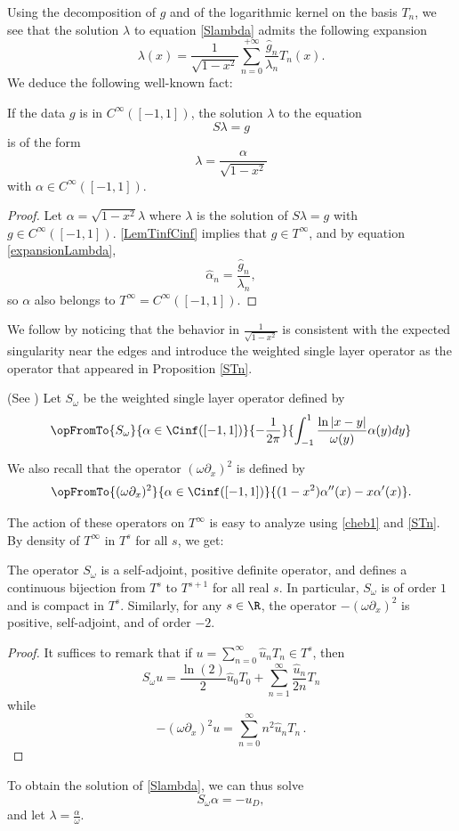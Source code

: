 \documentclass[a4paper]{article}
\begin{document}
	Using the decomposition of $g$ and of the logarithmic kernel on the basis $T_n$, we see that the solution $\lambda$ to equation \eqref{Slambda} admits the following expansion 
	\begin{equation}
	\lambda(x) = \frac{1}{\sqrt{1-x^2}}\sum_{n=0}^{+ \infty} \frac{\hat{g}_n}{\lambda_n} T_n(x).
	\label{expansionLambda}
	\end{equation}
	We deduce the following well-known fact:
	\begin{Cor}
		\label{CorSingularity}
		If the data $g$ is in $C^{\infty}([-1,1])$, the solution $\lambda$ to the equation 
		\[S\lambda = g\]
		is of the form 
		\[\lambda = \dfrac{\alpha}{\sqrt{1-x^2}}\]
		with $\alpha \in C^{\infty}([-1,1])$.  
		\begin{proof}
			Let $\alpha = \sqrt{1 - x^2}\lambda$ where $\lambda$ is the solution of $S\lambda = g$ with $g \in C^{\infty}([-1,1])$. 
			\autoref{LemTinfCinf} implies that $g \in T^{\infty}$, and by equation \eqref{expansionLambda}, 
			\[ \hat{\alpha}_n = \frac{\hat{g}_n}{\lambda_n},\]
			so $\alpha$ also  belongs to $T^{\infty} = C^{\infty}([-1,1])$. 
		\end{proof}
	\end{Cor}
	
	
	We follow \cite{bruno2012second} by noticing that the behavior in $\frac{1}{\sqrt{1-x^2}}$ is consistent with the expected singularity near the edges and introduce the weighted single layer operator as the operator that appeared in Proposition \ref{STn}.
	\begin{Def}(See \cite{bruno2012second}) 
		Let $S_\omega$ be the weighted single layer operator defined by
		\[\opFromTo{S_\omega}{\alpha \in \Cinf([-1,1])}{-\dfrac{1}{2\pi}}{\int_{-1}^1\dfrac{\ln|x-y|}{\omega(y)} \alpha(y)dy}\]
	\end{Def}
	\noindent We also recall that the operator $(\omega\partial_x)^2$ is defined by \[\opFromTo{(\omega\partial_x)^2}{\alpha \in \Cinf([-1,1])}{(1-x^2)\alpha''(x) - x \alpha'(x)}.\]
	
	The action of these operators on $T^{\infty}$ is easy to analyze using \eqref{cheb1} and \autoref{STn}. By density of $T^{\infty}$ in $T^s$ for all $s$, we get:
	\begin{Prop}
		The operator $S_\omega$ is a self-adjoint, positive definite operator, and defines a continuous bijection from $T^{s}$ to $T^{s+1}$ for all real $s$. In particular, $S_\omega$ is of order $1$ and is compact in $T^s$. 
		Similarly, for any $s \in \R$, the operator $-(\omega \partial_x)^2$ is positive, self-adjoint, and of order $-2$. 
	\end{Prop}
	\begin{proof}
		It suffices to remark that if $u=\sum_{n=0}^\infty \hat{u}_n T_n \in T^s$, then
		\[S_\omega u = \frac{\ln(2)}{2} \hat{u}_0 T_0 +  \sum_{n=1}^\infty \frac{\hat{u}_n}{2n} T_n\]
		while
		\[-(\omega \partial_x)^2 u = \sum_{n=0}^\infty n^2\hat{u}_n T_n \,.\]
	\end{proof}
	\noindent To obtain the solution of \eqref{Slambda}, we can thus solve 
	\begin{equation}
	S_\omega \alpha = -u_D,
	\label{Somegaalpha}
	\end{equation}
	and let $\lambda = \frac{\alpha}{\omega}$.  
	
\end{document}
